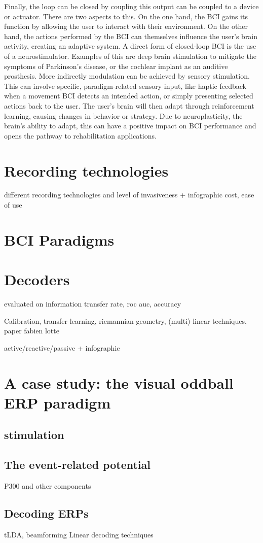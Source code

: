 Finally, the loop can be closed by coupling this output can be coupled to a
device or actuator.
There are two aspects to this.
On the one hand, the BCI gains its function by allowing the user to interact
with their environment.
On the other hand, the actions performed by the BCI can themselves influence
the user's brain activity, creating an adaptive system.
A direct form of closed-loop BCI is the use of a neurostimulator.
Examples of this are deep brain stimulation to mitigate the symptoms of
Parkinson's disease, or the cochlear implant as an auditive prosthesis.
More indirectly modulation can be achieved by sensory stimulation.
This can involve specific, paradigm-related sensory input, like haptic feedback when a
movement BCI detects an intended action, or simply presenting selected actions
back to the user.
The user's brain will then adapt through reinforcement learning, causing
changes in behavior or strategy.
Due to neuroplasticity, the brain's ability to adapt, this can have a positive
impact on BCI performance and opens the pathway to rehabilitation applications.




\section{Recording technologies}
\label{sec:bci-recording}
different recording technologies and level of invasiveness + infographic
cost, ease of use
\section{BCI Paradigms}
\label{sec:bci-paradigms}

\section{Decoders}
\label{sec:bci-decoders}
evaluated on
information transfer rate,
roc auc,
accuracy

Calibration, transfer learning, riemannian geometry, (multi)-linear techniques,
paper fabien lotte

active/reactive/passive + infographic


\section{A case study: the visual oddball ERP paradigm}
\subsection{stimulation}
\subsection{The event-related potential}
P300 and other components
\subsection{Decoding ERPs}
tLDA, beamforming
Linear decoding techniques
